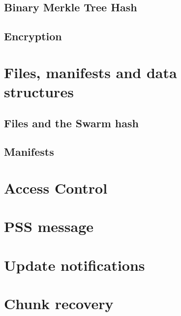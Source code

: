 \subsection{Binary Merkle Tree Hash \statusyellow}\label{spec:format:bmt}

\subsection{Encryption \statusyellow}\label{spec:format:encryption}


\section{Files, manifests and data structures}\label{spec:format:data-structures}
\subsection{Files and the Swarm hash \statusyellow}\label{spec:format:files}

\subsection{Manifests \statusyellow}\label{spec:format:manifests}

%

\section{Access Control \statusorange}\label{spec:format:access-control}


\section{PSS message \statusyellow}\label{spec:format:pss-messsage}

\section{Update notifications \statusred}\label{spec:format:update-notifications}
%

\section{Chunk recovery  \statusyellow}\label{spec:format:recovery}


